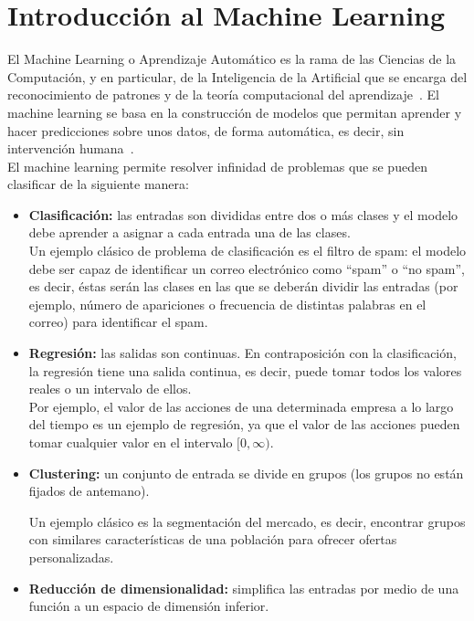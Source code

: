 \chapter{Introducción al Machine Learning}\label{cap:ml}

El Machine Learning o Aprendizaje Automático es la rama de las Ciencias de la Computación, y en particular, de la Inteligencia de la Artificial que se encarga del reconocimiento de patrones y de la teoría computacional del aprendizaje~\cite{machinelearningbritannica}. El machine learning se basa en la construcción de modelos que permitan aprender y hacer predicciones sobre unos datos, de forma automática, es decir, sin intervención humana~\cite{24218}.\\

El machine learning permite resolver infinidad de problemas que se pueden clasificar de la siguiente manera:

\begin{itemize}
	\item \textbf{Clasificación:} las entradas son divididas entre dos o más clases y el modelo debe aprender a asignar a cada entrada una de las clases.~\cite[pág 9]{Marsland:2009:MLA:1571643}\\
	
	Un ejemplo clásico de problema de clasificación es el filtro de spam: el modelo debe ser capaz de identificar un correo electrónico como ``spam'' o ``no spam'', es decir, éstas serán las clases en las que se deberán dividir las entradas (por ejemplo, número de apariciones o frecuencia de distintas palabras en el correo) para identificar el spam.
	
	\item \textbf{Regresión:} las salidas son continuas. En contraposición con la clasificación, la regresión tiene una salida continua, es decir, puede tomar todos los valores reales o un intervalo de ellos.~\cite[pág 8]{Marsland:2009:MLA:1571643}\\
	
	Por ejemplo, el valor de las acciones de una determinada empresa a lo largo del tiempo es un ejemplo de regresión, ya que el valor de las acciones pueden tomar cualquier valor en el intervalo $[0, \infty)$.
	
	\item \textbf{Clustering:} un conjunto de entrada se divide en grupos (los grupos no están fijados de antemano).~\cite[pág 195]{Marsland:2009:MLA:1571643}
	
	Un ejemplo clásico es la segmentación del mercado, es decir, encontrar grupos con similares características de una población para ofrecer ofertas personalizadas.
	
	\item \textbf{Reducción de dimensionalidad:} simplifica las entradas por medio de una función a un espacio de dimensión inferior.~\cite[pág 221]{Marsland:2009:MLA:1571643}   
\end{itemize}

